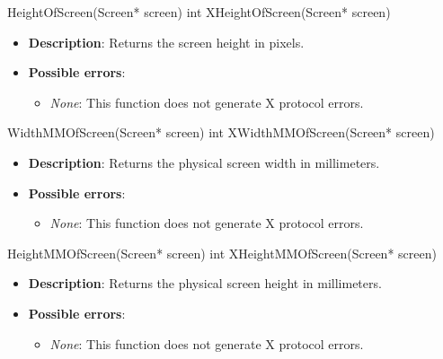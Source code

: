 \documentclass{report}
\begin{document}
\begin{itemize}
        \begin{cppcode}
            HeightOfScreen(Screen* screen)
            int XHeightOfScreen(Screen* screen)
        \end{cppcode}
        \begin{itemize}
            \item \textbf{Description}: Returns the screen height in pixels.
            \item \textbf{Possible errors}:
                \begin{itemize}
                    \item \textit{None}: This function does not generate X protocol errors.
                \end{itemize}
        \end{itemize}

        \begin{cppcode}
            WidthMMOfScreen(Screen* screen)
            int XWidthMMOfScreen(Screen* screen)
        \end{cppcode}
        \begin{itemize}
            \item \textbf{Description}: Returns the physical screen width in millimeters.
            \item \textbf{Possible errors}:
                \begin{itemize}
                    \item \textit{None}: This function does not generate X protocol errors.
                \end{itemize}
        \end{itemize}

        \begin{cppcode}
            HeightMMOfScreen(Screen* screen)
            int XHeightMMOfScreen(Screen* screen)
        \end{cppcode}
        \begin{itemize}
            \item \textbf{Description}: Returns the physical screen height in millimeters.
            \item \textbf{Possible errors}:
                \begin{itemize}
                    \item \textit{None}: This function does not generate X protocol errors.
                \end{itemize}
        \end{itemize}


\end{itemize}
\end{document}
